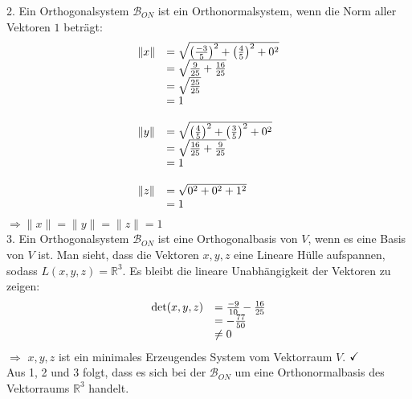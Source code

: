 \documentclass[main.tex]{subfiles}
\begin{document}
2. Ein Orthogonalsystem $\mathcal{B}_{ON}$ ist ein Orthonormalsystem, wenn die Norm aller Vektoren $1$ beträgt:
\begin{equation*}
    \begin{array}{ c l }
        \| x\|  & =\sqrt{\left(\frac{-3}{5}\right)^{2} +\left(\frac{4}{5}\right)^{2} +0^{2}}\\
        & =\sqrt{\frac{9}{25} +\frac{16}{25}}\\
        & =\sqrt{\frac{25}{25}}\\
        & =1\\
        & \\
        \| y\|  & =\sqrt{\left(\frac{4}{5}\right)^{2} +\left(\frac{3}{5}\right)^{2} +0^{2}}\\
        & =\sqrt{\frac{16}{25} +\frac{9}{25}}\\
        & =1\\
        & \\
        \| z\|  & =\sqrt{0^{2} +0^{2} +1^{2}}\\
        & =1
    \end{array}
\end{equation*}
$\Rightarrow \| x\| =\| y\| =\| z\| =1$\\


3. Ein Orthogonalsystem $\mathcal{B}_{ON}$ ist eine Orthogonalbasis von $V$, wenn es eine Basis von $V$ ist. 
Man sieht, dass die Vektoren $x,y,z$ eine Lineare Hülle aufspannen, sodass $L( x,y,z) =\mathbb{R}^{3}$. Es bleibt die lineare Unabhängigkeit der Vektoren zu zeigen:
\begin{equation*}
    \begin{array}{ c l }
        \det(x,y,z) & =\frac{-9}{10} - \frac{16}{25}\\
        & = -\frac{77}{50}\\
        & \neq 0
    \end{array}
\end{equation*}
$\Rightarrow$ $x,y,z$ ist ein minimales Erzeugendes System vom Vektorraum $V$. $\checkmark $\\

Aus 1, 2 und 3 folgt, dass es sich bei der $\mathcal{B}_{ON}$ um eine Orthonormalbasis des Vektorraums $\mathbb{R}^{3}$ handelt.
\end{document}
